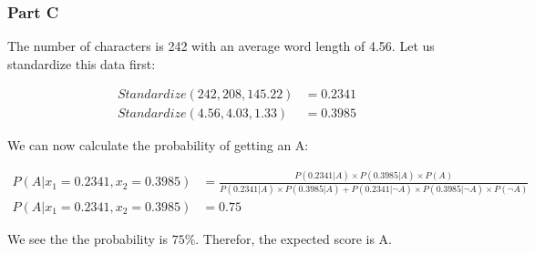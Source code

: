 \documentclass[12pt]{article}
\begin{document}
\subsubsection{Part C}
\noindent
The number of characters is 242 with an average word length of 4.56. Let us standardize this data first:

\begin{center}
    \begin{align*}
        Standardize(242, 208, 145.22) &= 0.2341\\
        Standardize(4.56, 4.03, 1.33) &= 0.3985
    \end{align*}
\end{center}

\noindent
We can now calculate the probability of getting an A:
\begin{center}
    \begin{align*} 
        P(A|x_1=0.2341, x_2=0.3985) &= \frac{P(0.2341|A) \times P(0.3985|A) \times P(A)}{P(0.2341|A) \times P(0.3985|A) + P(0.2341|\neg A) \times P(0.3985|\neg A) \times P(\neg A)} \\
        P(A|x_1=0.2341, x_2=0.3985) &= 0.75
    \end{align*}
\end{center}

\noindent
We see the the probability is $ 75\% $. Therefor, the expected score is A.
\end{document}
